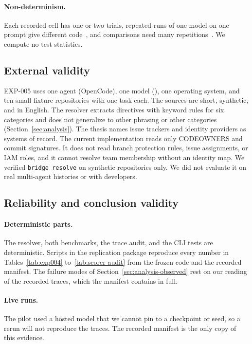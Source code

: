 \paragraph{Non-determinism.} Each recorded cell has one or two trials, repeated runs of one model on one prompt give different code~\cite{ouyang2025nondeterminism}, and comparisons need many repetitions~\cite{arcuri2011stats}. We compute no test statistics.

\subsection{External validity}
EXP-005 uses one agent (OpenCode), one model (\modelname), one operating system, and ten small fixture repositories with one task each. The sources are short, synthetic, and in English. The resolver extracts directives with keyword rules for six categories and does not generalize to other phrasing or other categories (Section~\ref{sec:analysis}). The thesis names issue trackers and identity providers as systems of record. The current implementation reads only CODEOWNERS and commit signatures. It does not read branch protection rules, issue assignments, or IAM roles, and it cannot resolve team membership without an identity map. We verified \texttt{bridge resolve} on synthetic repositories only. We did not evaluate it on real multi-agent histories or with developers.

\subsection{Reliability and conclusion validity}
\label{sec:threats-reliability}
\paragraph{Deterministic parts.} The resolver, both benchmarks, the trace audit, and the CLI tests are deterministic. Scripts in the replication package reproduce every number in Tables~\ref{tab:exp004} to~\ref{tab:scorer-audit} from the frozen code and the recorded manifest. The failure modes of Section~\ref{sec:analysis-observed} rest on our reading of the recorded traces, which the manifest contains in full.

\paragraph{Live runs.} The pilot used a hosted model that we cannot pin to a checkpoint or seed, so a rerun will not reproduce the traces. The recorded manifest is the only copy of this evidence.

